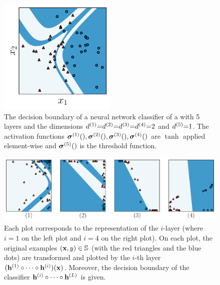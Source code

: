\begin{figure}
    \centering
    \includegraphics[width=0.5\textwidth]{chapter_1/figures/neural_network.pdf}
    \caption[Example of Neural Network]{
    The decision boundary of a neural network classifier of a with 5 layers and the dimensions $d^{(1)}{=}d^{(2)}{=}d^{(3)}{=}d^{(4)}{=}2$ and $d^{(5)}{=}1$.
    The activation functions $\boldsymbol{\sigma}^{(1)}(),\boldsymbol{\sigma}^{(2)}(),\boldsymbol{\sigma}^{(3)}(),\boldsymbol{\sigma}^{(4)}()$ are $\tanh$ applied element-wise and $\boldsymbol{\sigma}^{(5)}()$ is the threshold function. 
    }
    \label{chap:intro:fig:neural-network}
\end{figure}

\begin{figure}
    \centering
    \includegraphics[width=1.0\textwidth]{chapter_1/figures/neural_network_full.pdf}
    \caption[Details on the Neural Network of ]{
    Each plot corresponds to the representation of the $i$-layer (where $i=1$ on the left plot and $i=4$ on the right plot).
    On each plot, the original examples $(\mathbf{x},y)\in\mathbb{S}$ (with the red triangles and the blue dots) are transformed and plotted by the $i$-th layer $(\mathbf{h}^{(1)}\circ\dots\circ\mathbf{h}^{(i)})(\mathbf{x})$.
    Moreover, the decision boundary of the classifier $\mathbf{h}^{(i)}\circ\dots\circ\mathbf{h}^{(L)}$ is given.
    }
    \label{chap:intro:fig:neural-network-details}
\end{figure}

